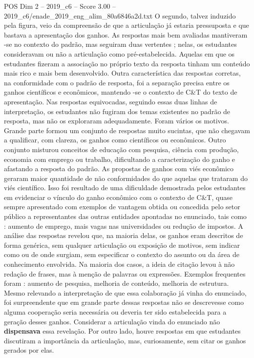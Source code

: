 \begin{textsample}{POS Dim 2 – 2019\_c6 – Score 3.00 – 2019\_c6/enade\_2019\_eng\_alim\_80a6846a2d.txt}
O segundo, talvez induzido pela figura, veio da compreensão de que a articulação já estaria pressuposta e que bastava a apresentação dos ganhos.
As respostas mais bem avaliadas mantiveram -se no contexto do padrão, mas seguiram duas vertentes ; nelas, os estudantes consideravam ou não a articulação como pré-estabelecida.
Aquelas em que os estudantes fizeram a associação no próprio texto da resposta tinham um conteúdo mais rico e mais bem desenvolvido.
Outra característica das respostas corretas, na conformidade com o padrão de resposta, foi a separação precisa entre os ganhos científicos e econômicos, mantendo -se o contexto de C\&T do texto de apresentação.
Nas respostas equivocadas, seguindo essas duas linhas de interpretação, os estudantes não fugiram dos temas existentes no padrão de resposta, mas não os exploraram adequadamente.
Foram vários os motivos.
Grande parte formou um conjunto de respostas muito sucintas, que não chegavam a qualificar, com clareza, os ganhos como científicos ou econômicos.
Outro conjunto misturou conceitos de educação com pesquisa, ciência com produção, economia com emprego ou trabalho, dificultando a caracterização do ganho e afastando a resposta do padrão.
As propostas de ganhos com viés econômico geraram maior quantidade de não conformidades do que aquelas que trataram do viés científico.
Isso foi resultado de uma dificuldade demostrada pelos estudantes em evidenciar o vínculo do ganho econômico com o contexto de C\&T, quase sempre apresentado com exemplos de vantagem obtida ou concedida pelo setor público a representantes das outras entidades apontadas no enunciado, tais como : aumento de emprego, mais vagas nas universidades ou redução de impostos.
A análise das respostas revelou que, na maioria delas, os ganhos eram descritos de forma genérica, sem qualquer articulação ou exposição de motivos, sem indicar como ou de onde surgiam, sem especificar o contexto do assunto ou da área de conhecimento envolvida.
Na maioria dos casos, a ideia de citação levou à não redação de frases, mas à menção de palavras ou expressões.
Exemplos frequentes foram : aumento de pesquisa, melhoria de conteúdo, melhoria de estrutura.
Mesmo relevando a interpretação de que essa colaboração já vinha do enunciado, foi surpreendente que em grande parte dessas respostas não se descrevesse como alguma cooperação seria necessária ou deveria ter sido estabelecida para a geração desses ganhos.
Considerar a articulação vinda do enunciado não \textbf{dispensava} essa revelação.
Por outro lado, houve respostas em que estudantes discutiram a importância da articulação, mas, curiosamente, sem citar os ganhos gerados por elas.

\end{textsample}
